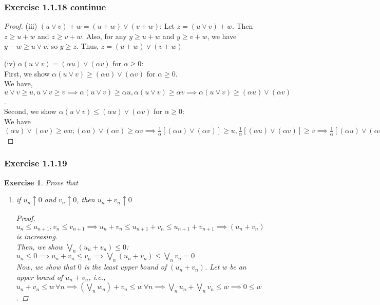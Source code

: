 \documentclass[11pt,xcolor={dvipsnames},hyperref={pdftex,pdfpagemode=UseNone,hidelinks,pdfdisplaydoctitle=true},usepdftitle=false]{beamer}
\newtheorem{exercise}{Exercise}[section]
\begin{document}
\begin{frame}
\frametitle{Exercise 1.1.18 continue}
\begin{proof}

(iii) $(u \vee v) + w = (u + w) \vee (v + w)$:
   Let $z = (u \vee v) + w$. Then $z \geq u + w$ and $z \geq v + w$.
   Also, for any $y \geq u + w$ and $y \geq v + w$, we have $y - w \geq u \vee v$, so $y \geq z$.
   Thus, $z = (u + w) \vee (v + w)$

(iv) $\alpha(u \vee v) = (\alpha u) \vee (\alpha v)$ for $\alpha \geq 0$:\\
First, we show $\alpha(u \vee v) \ge (\alpha u) \vee (\alpha v)$ for $\alpha \geq 0$.\\ We have, $u\vee v\ge u, u\vee v\ge v\implies \alpha(u\vee v)\ge \alpha u, \alpha (u\vee v)\ge \alpha v\implies \alpha(u\vee v)\ge (\alpha u)\vee (\alpha v)$.\\
Second, we show $\alpha(u \vee v) \le (\alpha u) \vee (\alpha v)$ for $\alpha \geq 0$:\\
We have $(\alpha u) \vee (\alpha v)\ge \alpha u; (\alpha u) \vee (\alpha v)\ge \alpha v\implies \frac{1}{\alpha}[(\alpha u) \vee (\alpha v)]\ge u, \frac{1}{\alpha}[(\alpha u) \vee (\alpha v)]\ge v\implies \frac{1}{\alpha}[(\alpha u) \vee (\alpha v)]\ge u \vee v\implies (\alpha u) \vee (\alpha v)\ge \alpha (u\vee v)$
\end{proof}
\end{frame}

\begin{frame}
\frametitle{Exercise 1.1.19}
\begin{exercise}
Prove that
\begin{enumerate}
\item[(i)] if $u_n \uparrow 0$ and $v_n \uparrow 0$, then $u_n + v_n \uparrow 0$
\begin{proof}
$u_n\le u_{n+1}, v_n\le v_{n+1} \implies u_n+v_n\le u_{n+1}+v_n \le u_{n+1}+v_{n+1}\implies (u_n+v_n)$ is increasing.\\
Then, we show $\bigvee_n (u_n+v_n)\le 0$:\\
$u_n \le 0 \implies u_n+v_n\le v_n \implies \bigvee_n (u_n+v_n)\le \bigvee_n v_n =0$\\
Now, we show that $0$ is the least upper bound of $(u_n+v_n)$. Let $w$ be an upper bound of $u_n+v_n$, i.e.,
$u_n+v_n\le w\,\forall n\implies \left(\bigvee_n w_n\right) + v_n \le w\,\forall n\implies \bigvee_n u_n + \bigvee_n v_n \le w\implies 0\le w$. 
\end{proof}
\end{enumerate}
\end{exercise}
\end{frame}
\end{document}

